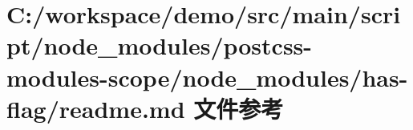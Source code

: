 \hypertarget{node__modules_2postcss-modules-scope_2node__modules_2has-flag_2_r_e_a_d_m_e_8md}{}\section{C\+:/workspace/demo/src/main/script/node\+\_\+modules/postcss-\/modules-\/scope/node\+\_\+modules/has-\/flag/readme.md 文件参考}
\label{node__modules_2postcss-modules-scope_2node__modules_2has-flag_2_r_e_a_d_m_e_8md}
